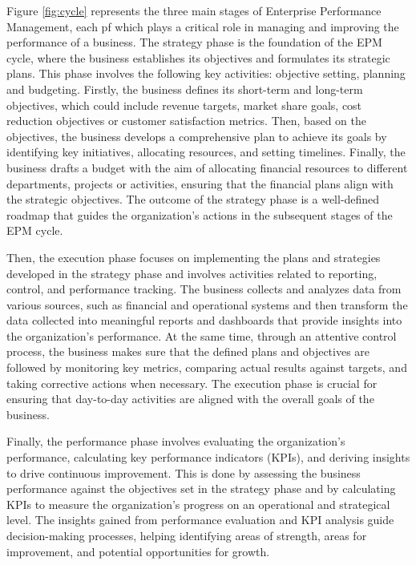 \documentclass[12pt,a4paper,openright,twoside]{book}
\begin{document}
Figure \ref{fig:cycle} represents the three main stages of Enterprise Performance Management, each pf which plays a critical role in managing and improving the performance of a business. 
%
The strategy phase is the foundation of the EPM cycle, where the business establishes its objectives and formulates its strategic plans. 
%
This phase involves the following key activities: objective setting, planning and budgeting.
%
Firstly, the business defines its short-term and long-term objectives, which could include revenue targets, market share goals, cost reduction objectives or customer satisfaction metrics.
%
Then, based on the objectives, the business develops a comprehensive plan to achieve its goals by identifying key initiatives, allocating resources, and setting timelines.
%
Finally, the business drafts a budget with the aim of allocating financial resources to different departments, projects or activities, ensuring that the financial plans align with the strategic objectives.
%
The outcome of the strategy phase is a well-defined roadmap that guides the organization's actions in the subsequent stages of the EPM cycle.

Then, the execution phase focuses on implementing the plans and strategies developed in the strategy phase and involves activities related to reporting, control, and performance tracking.
%
The business collects and analyzes data from various sources, such as financial and operational systems and then transform the data collected into meaningful reports and dashboards that provide insights into the organization's performance.
%
At the same time, through an attentive control process, the business makes sure that the defined plans and objectives are followed by monitoring key metrics, comparing actual results against targets, and taking corrective actions when necessary.
%
The execution phase is crucial for ensuring that day-to-day activities are aligned with the overall goals of the business.

Finally, the performance phase involves evaluating the organization's performance, calculating key performance indicators (KPIs), and deriving insights to drive continuous improvement. 
%
This is done by assessing the business performance against the objectives set in the strategy phase and by calculating KPIs to measure the organization's progress on an operational and strategical level.
%
The insights gained from performance evaluation and KPI analysis guide decision-making processes, helping identifying areas of strength, areas for improvement, and potential opportunities for growth.
\end{document}
